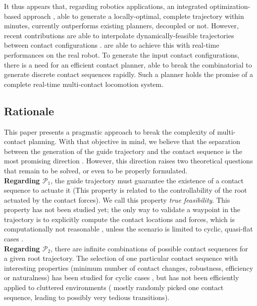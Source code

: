 It thus appears that, regarding robotics applications, an integrated optimization-based approach \citep{Mordatch:2012:DCB:2185520.2185539}, able to generate a locally-optimal, complete trajectory within minutes, currently outperforms existing planners, decoupled or not. However, recent contributions are able to interpolate dynamically-feasible
trajectories between contact configurations \citep{Hauser2014, herzog2015trajectory, Park116, Carpentier2016}. \citeauthor{Carpentier2016} are able to achieve this with real-time performances on the real robot.
To generate the input contact configurations, there is a need for an efficient contact planner, able to break the combinatorial to generate discrete contact sequences rapidly. 
Such a planner holds the promise of a complete real-time multi-contact locomotion system.

\subsection{Rationale}
This paper presents a pragmatic approach to break the complexity of multi-contact planning. With that objective in mind,
we believe that the separation between the generation of the guide trajectory and the contact sequence is the most promising direction \citep{DBLP:conf/iser/EscandeKMG08}.
However, this direction raises two theoretical questions that remain to be solved, or even to be properly formulated. \\

\noindent \textbf{Regarding $\mathcal{P}_1$}, the guide trajectory must guarantee the existence of a contact sequence to actuate it (This property is related to the controllability of the root actuated by the contact forces). We call this property \textit{true feasibility}. This property has not been studied yet; the only way to validate a waypoint in the trajectory is to explicitly compute the contact locations and forces, which is computationally not reasonable \citep{Bouyarmane2009}, unless the scenario is limited to cyclic, quasi-flat cases \citep{zucker2010optimization}. \\

\noindent \textbf{Regarding $\mathcal{P}_2$}, there are infinite combinations of possible contact sequences for a given root trajectory. The selection of one particular contact sequence with interesting properties (minimum number of contact changes, robustness, efficiency or naturalness) has been studied for cyclic cases \citep{Hauser06usingmotion}, but has not been efficiently applied to cluttered environments (\citeauthor{bouyarmane:lirmm-00777727, DBLP:conf/iser/EscandeKMG08} mostly randomly picked one contact sequence, leading to possibly very tedious transitions).  \\


